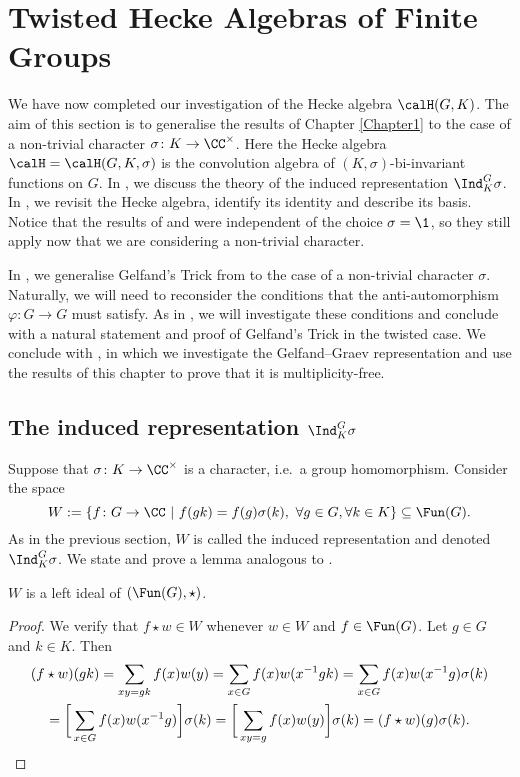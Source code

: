 \section{Twisted Hecke Algebras of Finite Groups}\label{Chapter2}
We have now completed our investigation of the Hecke algebra $\calH(G,K)$.
The aim of this section is to generalise the results of Chapter \ref{Chapter1} to the case of a non-trivial character $\sigma\colon K\to\CC^\times$.
Here the Hecke algebra $\calH=\calH(G,K,\sigma)$ is the convolution algebra of $(K,\sigma)$-bi-invariant functions on $G$.
In , we discuss the theory of the induced representation $\Ind_K^G \sigma$.
In , we revisit the Hecke algebra, identify its identity and describe its basis.
Notice that the results of  and  were independent of the choice $\sigma=\1$, so they still apply now that we are considering a non-trivial character.

In , we generalise Gelfand's Trick from  to the case of a non-trivial character $\sigma$.
Naturally, we will need to reconsider the conditions that the anti-automorphism $\varphi\colon G\to G$ must satisfy.
As in , we will investigate these conditions and conclude with a natural statement and proof of Gelfand's Trick in the twisted case.
We conclude with , in which we investigate the Gelfand--Graev representation and use the results of this chapter to prove that it is multiplicity-free.


\subsection{The induced representation $\Ind_K^G \sigma$}\label{Section2.1}
Suppose that $\sigma\colon K \to\CC^\times$ is a character, i.e.\ a group homomorphism.
Consider the space
\[
    W := \{f\colon G\to \CC\ |\ f(gk) = f(g)\sigma(k),\ \forall g\in G, \forall k \in K\} \subseteq \Fun(G).
\]
As in the previous section, $W$ is called the induced representation and denoted $\Ind_K^G \sigma$.
We state and prove a lemma analogous to .
\begin{lem}\label{lemma: W_left_ideal_two}
    $W$ is a left ideal of $(\Fun(G),\star)$.
\end{lem}
\begin{proof}
    We verify that $f\star w\in W$ whenever $w\in W$ and $f\in\Fun(G)$.
    Let $g\in G$ and $k\in K$.
    Then
    \begin{multline*}
        (f\star w)(gk) = \sum_{xy=gk} f(x)w(y) = \sum_{x\in G} f(x)w(x^{-1}gk) = \sum_{x\in G} f(x)w(x^{-1}g)\sigma(k) \\
        = \bigg[\sum_{x\in G} f(x)w(x^{-1}g)\bigg]\sigma(k) = \bigg[\sum_{xy=g} f(x)w(y)\bigg]\sigma(k) = (f\star w)(g)\sigma(k).\qedhere
    \end{multline*}
\end{proof}

